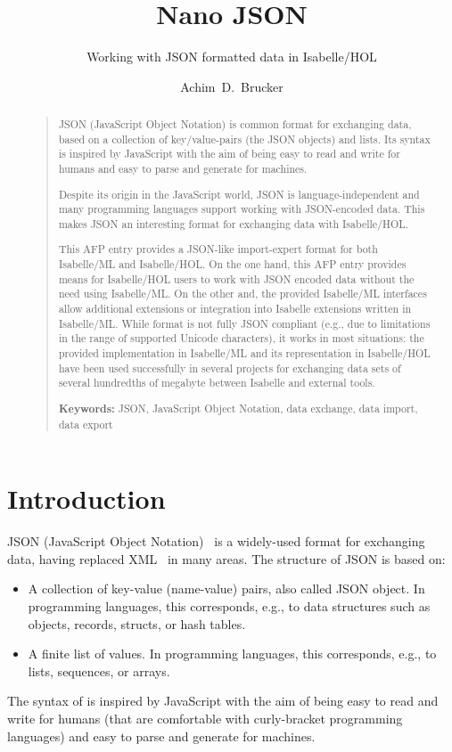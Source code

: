 \documentclass[11pt,DIV=12,a4paper,abstract=true,twoside=semi,openright]
{scrreprt}
\title{Nano JSON}
\subtitle{Working with JSON formatted data in Isabelle/HOL}
\author{Achim~D.~Brucker}%
\begin{document}
  \maketitle
  \begin{abstract}
    \begin{quote}
      JSON (JavaScript Object Notation) is common format for exchanging data,
      based on a collection of key/value-pairs (the JSON objects) and lists. Its
      syntax is inspired by JavaScript with the aim of being easy to read and
      write for humans and easy to parse and generate for machines. 
  
      Despite its origin in the JavaScript world, JSON is language-independent
      and many programming languages support working with JSON-encoded data.
      This makes JSON an interesting format for exchanging data with
      Isabelle/HOL.
 
      This AFP entry provides a JSON-like import-expert format for both
      Isabelle/ML and Isabelle/HOL. On the one hand, this AFP entry provides
      means for Isabelle/HOL users to work with JSON encoded data without the
      need using Isabelle/ML. On the other and, the provided Isabelle/ML
      interfaces allow additional extensions or integration into Isabelle
      extensions written in Isabelle/ML. While format is not fully JSON
      compliant (e.g., due to limitations in the range of supported Unicode
      characters), it works in most situations: the provided implementation in
      Isabelle/ML and its representation in Isabelle/HOL have been used
      successfully in several projects for exchanging data sets of several
      hundredths of megabyte between Isabelle and external tools.

      \bigskip
      \noindent\textbf{Keywords:} JSON, JavaScript Object Notation, data
        exchange, data import, data export 
    \end{quote}
  \end{abstract}
\tableofcontents


\chapter{Introduction}
JSON (JavaScript Object Notation)~\cite{ecma:json:2017,ietf:rfc8259-json:2017}
is a widely-used format for exchanging data, having replaced
XML~\cite{bray.ea:extensible:2008} in many areas. The structure of JSON is based
on:
\begin{itemize}
\item A collection of key-value (name-value) pairs, also called JSON object. In
  programming languages, this corresponds, e.g., to data structures such as
  objects, records, structs, or hash tables. 
\item A finite list of values. In programming languages, this corresponds, e.g.,
  to lists, sequences, or arrays. 
\end{itemize}
The syntax of  is inspired by JavaScript with the aim of being easy to read and
write for humans (that are comfortable with curly-bracket programming languages)
and easy to parse and generate for machines. 
\end{document}
